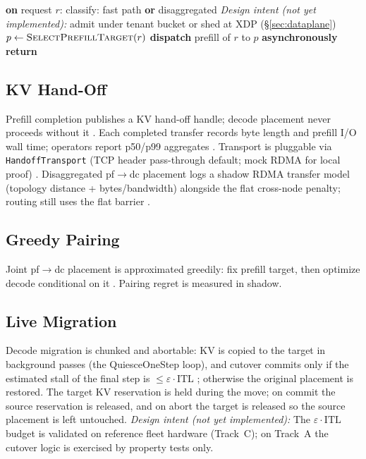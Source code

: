 \documentclass[11pt]{article}
\newcommand{\intent}[1]{\textit{Design intent (not yet implemented):} #1}
\begin{document}
\begin{algorithm}[h]
\caption{Route (target behavior; Phase~1)}
\begin{algorithmic}[1]
\State \textbf{on} request $r$:
\State classify: fast path \textbf{or} disaggregated
\State \intent{admit under tenant bucket or shed at XDP (\S\ref{sec:dataplane})}
\State $p \gets \textsc{SelectPrefillTarget}(r)$
\State \textbf{dispatch} prefill of $r$ to $p$ \textbf{asynchronously}
\State \textbf{return} 
\end{algorithmic}
\end{algorithm}

\subsection{KV Hand-Off}\label{sec:handoff}
Prefill completion publishes a KV hand-off handle; decode placement never
proceeds without it . Each completed transfer records byte
length and prefill I/O wall time; operators report p50/p99 aggregates
. Transport is pluggable via
\texttt{HandoffTransport} (TCP header pass-through default; mock RDMA for local
proof) . Disaggregated pf$\to$dc placement logs a
shadow RDMA transfer model (topology distance + bytes/bandwidth) alongside the
flat cross-node penalty; routing still uses the flat barrier
.

\subsection{Greedy Pairing}\label{sec:pairing}
Joint pf$\to$dc placement is approximated greedily: fix prefill target,
then optimize decode conditional on it . Pairing regret is
measured in shadow.

\subsection{Live Migration}\label{sec:migration}
Decode migration is chunked and abortable: KV is copied to the target in
background passes (the QuiesceOneStep loop), and cutover commits only if the
estimated stall of the final step is $\le \varepsilon\cdot\mathrm{ITL}$
; otherwise the original placement is restored. The target
KV reservation is held during the move; on commit the source reservation is
released, and on abort the target is released so the source placement is left
untouched. \intent{The $\varepsilon\cdot\mathrm{ITL}$ budget is validated on
reference fleet hardware (Track~C); on Track~A the cutover logic is exercised by
property tests only.}
\end{document}

